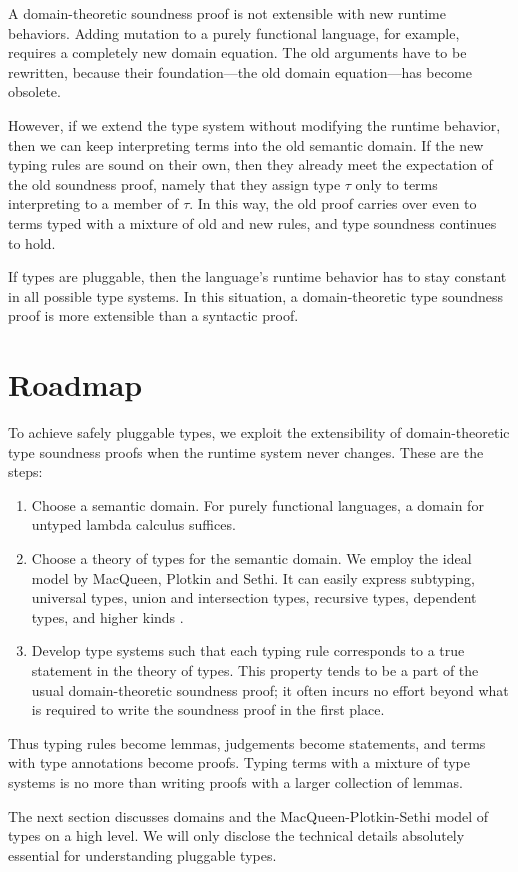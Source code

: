 \documentclass{amsart}
\def\thingsExpressibleInMpsModel{%
subtyping, universal types, union and intersection types,
recursive types, dependent types, and higher kinds%
}
\begin{document}
A domain-theoretic soundness proof is not extensible with new
runtime behaviors. Adding mutation to a purely functional
language, for example, requires a completely new domain equation.
The old arguments have to be rewritten, because their
foundation---the old domain equation---has become obsolete.

However, if we extend the type system without modifying the
runtime behavior, then we can keep interpreting terms into the
old semantic domain. If the new typing rules are sound on their
own, then they already meet the expectation of the old soundness
proof, namely that they assign type $\tau$ only to terms
interpreting to a member of $\tau$. In this way, the old proof
carries over even to terms typed with a mixture of old and new
rules, and type soundness continues to hold.

If types are pluggable, then the language's runtime behavior has
to stay constant in all possible type systems. In this situation,
a domain-theoretic type soundness proof is more extensible than a
syntactic proof.


\section{Roadmap}

To achieve safely pluggable types, we exploit the extensibility
of domain-theoretic type soundness proofs when the runtime system
never changes. These are the steps:
\begin{enumerate}
\item Choose a semantic domain. For purely functional languages,
a domain for untyped lambda calculus suffices.
\item Choose a theory of types for the semantic domain. We employ
the ideal model by MacQueen, Plotkin and Sethi. It can easily
express \thingsExpressibleInMpsModel.
\item Develop type systems such that each typing rule corresponds
to a true statement in the theory of types. This property tends
to be a part of the usual domain-theoretic soundness proof; it
often incurs no effort beyond what is required to write the
soundness proof in the first place.
\end{enumerate}
Thus typing rules become lemmas, judgements become statements,
and terms with type annotations become proofs. Typing terms with
a mixture of type systems is no more than writing proofs with a
larger collection of lemmas.

The next section discusses domains and the MacQueen-Plotkin-Sethi
model of types on a high level. We will only disclose the
technical details absolutely essential for understanding
pluggable types.
\end{document}
